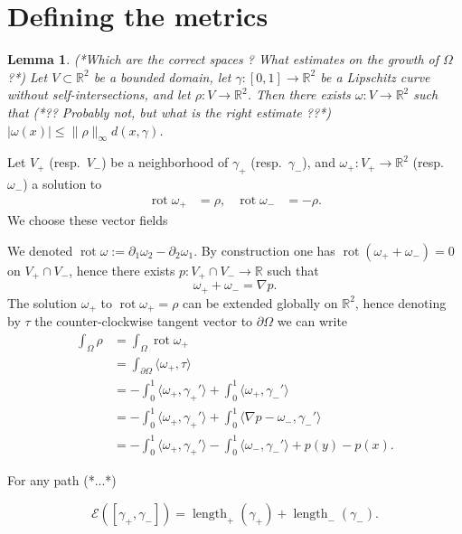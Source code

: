 \documentclass[11pt]{article}
\newtheorem{lemma}[definition]{Lemma}
\def\bR{{\mathbb R}}
\def\mR{{\mathbb R}}
\def\cE{{\mathcal E}}
\DeclareMathOperator\rot{rot}
\DeclareMathOperator\length{length}
\def\<{\langle} \def\>{\rangle}
\begin{document}
\section{Defining the metrics}


\begin{lemma} (*Which are the correct spaces ? What estimates on the growth of $\Omega$ ?*)
	Let $V \subset \bR^2$ be a bounded domain, let $\gamma : [0,1] \to \bR^2$ be a Lipschitz curve without self-intersections, and let $\rho : V \to \bR^2$.
	Then there exists $\omega : V \to \bR^2$ such that (*?? Probably not, but what is the right estimate ??*) $|\omega(x)| \leq \|\rho\|_\infty d(x,\gamma)$.
\end{lemma}

Let $V_+$ (resp.\ $V_-$) be a neighborhood of $\gamma_+$ (resp.\ $\gamma_-$), and $\omega_+ : V_+ \to \mR^2$ (resp.\ $\omega_-$) a solution to
\begin{align*}
	\rot \omega_+ &= \rho,
	& \rot \omega_- &= - \rho.
\end{align*}
We choose these vector fields 

We denoted $\rot \omega := \partial_1 \omega_2-\partial_2\omega_1$.
By construction one has $\rot(\omega_+ + \omega_-) = 0$ on $V_+ \cap V_-$, hence there exists $p : V_+ \cap V_- \to \mR$ such that 
\begin{equation*}
	\omega_+ +\omega_- = \nabla p.
\end{equation*}
The solution $\omega_+$ to $\rot \omega_+ = \rho$ can be extended globally on $\mR^2$, hence denoting by $\tau$ the counter-clockwise tangent vector to $\partial \Omega$ we can write
\begin{align*}
	\int_\Omega \rho &= \int_\Omega \rot \omega_+\\
	&= \int_{\partial \Omega} \<\omega_+,\tau\>\\
	&= - \int_0^1 \<\omega_+,\gamma_+'\> + \int_0^1 \<\omega_+,\gamma_-'\>\\
	&= - \int_0^1 \<\omega_+,\gamma_+'\> + \int_0^1 \<\nabla p - \omega_-,\gamma_-'\>\\
	&= - \int_0^1 \<\omega_+,\gamma_+'\> - \int_0^1 \<\omega_-,\gamma_-'\> + p(y)-p(x).
\end{align*}

For any path 
(*...*)

\begin{equation*}
	\cE([\gamma_+,\gamma_-]) = \length_+(\gamma_+) + \length_-(\gamma_-).
\end{equation*}
\end{document}
